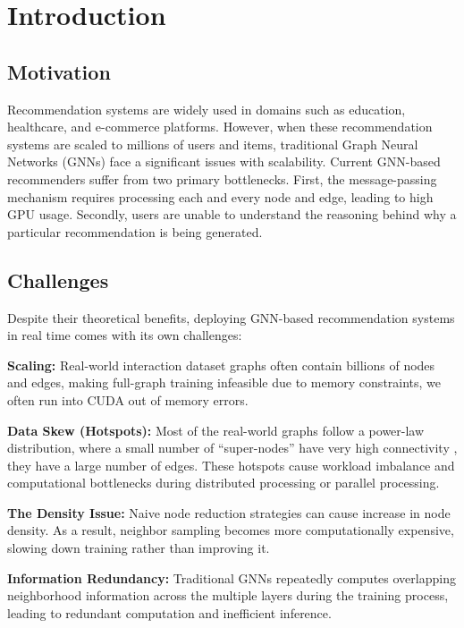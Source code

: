 \chapter{Introduction}
\graphicspath{{Chapter1/}}

\section{Motivation}

Recommendation systems are widely used in domains such as education, healthcare,
and e-commerce platforms. However, when these recommendation systems are scaled to millions of users
and items, traditional Graph Neural Networks (GNNs) face a significant issues with
scalability.
\newline
Current GNN-based recommenders suffer from two primary bottlenecks. First, the
message-passing mechanism requires processing each and every node and edge, leading to high GPU usage. Secondly, users are unable to understand the reasoning behind why a particular recommendation is being generated.

\section{Challenges}

Despite their theoretical benefits, deploying GNN-based recommendation systems in real time comes with its own challenges:

\textbf{Scaling:}  
Real-world interaction dataset graphs often contain billions of nodes and edges, making full-graph training infeasible due to memory constraints, we often run into CUDA out of memory errors.

\textbf{Data Skew (Hotspots):}  
 Most of the real-world graphs follow a power-law distribution,
where a small number of “super-nodes” have very high connectivity , they have a large number of edges. These hotspots cause workload imbalance and computational bottlenecks during distributed processing or parallel processing.

\textbf{The Density Issue:}  
Naive node reduction strategies can cause increase in node density. As a result, neighbor sampling becomes more computationally expensive, slowing down training rather than improving it.

\textbf{Information Redundancy:}  
Traditional GNNs repeatedly computes overlapping neighborhood information across the multiple layers during the training process, leading to redundant computation and inefficient inference.

